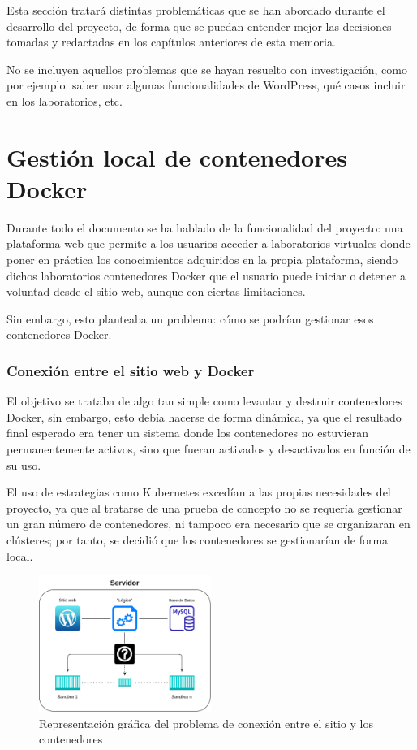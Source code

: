         Esta sección tratará distintas problemáticas que se han abordado durante el desarrollo del proyecto, de forma que se puedan entender mejor las decisiones tomadas y redactadas en los capítulos anteriores de esta memoria.

        No se incluyen aquellos problemas que se hayan resuelto con investigación, como por ejemplo: saber usar algunas funcionalidades de WordPress, qué casos incluir en los laboratorios, etc.

    \section{Gestión local de contenedores Docker}

        Durante todo el documento se ha hablado de la funcionalidad del proyecto: una plataforma web que permite a los usuarios acceder a laboratorios virtuales donde poner en práctica los conocimientos adquiridos en la propia plataforma, siendo dichos laboratorios contenedores Docker que el usuario puede iniciar o detener a voluntad desde el sitio web, aunque con ciertas limitaciones.
        
        Sin embargo, esto planteaba un problema: cómo se podrían gestionar esos contenedores Docker. 

        \subsubsection{Conexión entre el sitio web y Docker}

            El objetivo se trataba de algo tan simple como levantar y destruir contenedores Docker, sin embargo, esto debía hacerse de forma dinámica, ya que el resultado final esperado era tener un sistema donde los contenedores no estuvieran permanentemente activos, sino que fueran activados y desactivados en función de su uso.
            
            El uso de estrategias como Kubernetes excedían a las propias necesidades del proyecto, ya que al tratarse de una prueba de concepto no se requería gestionar un gran número de contenedores, ni tampoco era necesario que se organizaran en clústeres; por tanto, se decidió que los contenedores se gestionarían de forma local.
            \begin{figure}[htbp]
                \centering

                \includegraphics[width=0.5\textwidth]{images/Diagramas/conexion.png}
                \caption{Representación gráfica del problema de conexión entre el sitio y los contenedores}
                \label{fig:conexion}
            \end{figure}

